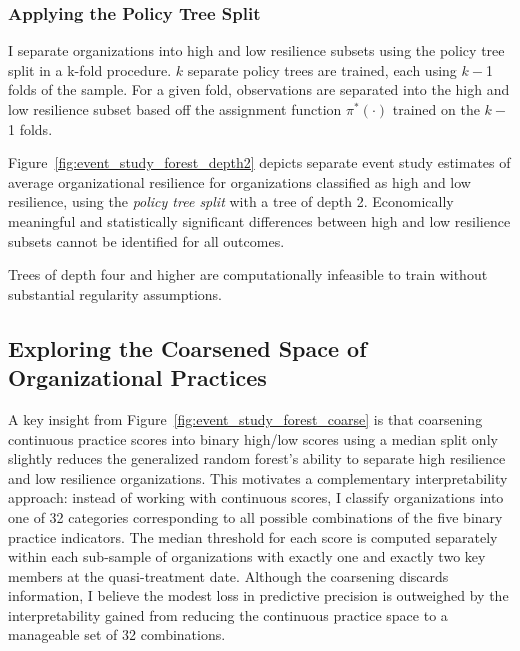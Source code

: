 \documentclass[12pt,notitlepage]{article}
\begin{document}
\subsubsection{Applying the Policy Tree Split}
I separate organizations into high and low resilience subsets using the policy tree split in a k-fold procedure.
$k$ separate policy trees are trained, each using $k-$1 folds of the sample. 
For a given fold, observations are separated into the high and low resilience subset based off the assignment function $\pi^*(\cdot)$ trained on the $k-$1 folds. 



Figure~\ref{fig:event_study_forest_depth2} depicts separate event study estimates of average organizational resilience for organizations classified as high and low resilience, using the \textit{policy tree split} with a tree of depth 2. 
Economically meaningful and statistically significant differences between high and low resilience subsets cannot be identified for all outcomes. 

Trees of depth four and higher are computationally infeasible to train without substantial regularity assumptions. 


\fi


\subsection{Exploring the Coarsened Space of Organizational Practices} \label{sec:coarsened_exploration}
A key insight from Figure~\ref{fig:event_study_forest_coarse} is that coarsening continuous practice scores into binary high/low scores using a median split only slightly reduces the generalized random forest’s ability to separate high resilience and low resilience organizations.
This motivates a complementary interpretability approach: instead of working with continuous scores, I classify organizations into one of 32 categories corresponding to all possible combinations of the five binary practice indicators.
The median threshold for each score is computed separately within each sub-sample of organizations with exactly one and exactly two key members at the quasi-treatment date.
Although the coarsening discards information, I believe the modest loss in predictive precision is outweighed by the interpretability gained from reducing the continuous practice space to a manageable set of 32 combinations.
\end{document}
